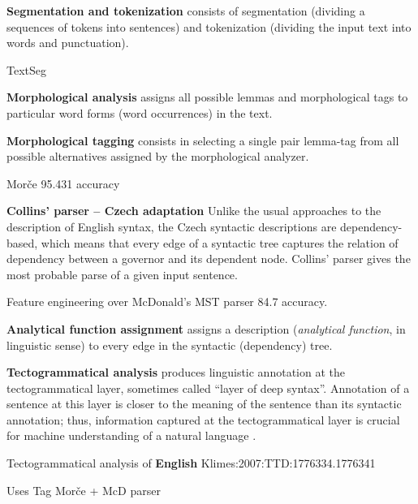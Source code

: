 \begin{description}
 
	\item \textbf{Segmentation and tokenization} consists of segmentation (dividing a sequences of tokens into sentences) and tokenization (dividing the input text into words and punctuation).
	
	TextSeg \citep{TextSeg}
		
	\item \textbf{Morphological analysis} \citep{biblio:HajicMorfTag} assigns all possible lemmas and morphological tags to particular word forms (word 
occurrences) in the text.
	
	\item \textbf{Morphological tagging} \citep{biblio:HajicMorfTag} consists in selecting a single pair lemma-tag from all possible alternatives assigned 
by the morphological analyzer.

Morče \citep{biblio:VoMorphologicalTagging2006} 95.431 accuracy
	
	\item \textbf{Collins' parser -- Czech adaptation} \citep{biblio:collinshbrt_1999} Unlike the usual approaches to the description of 
English syntax, the Czech syntactic descriptions are dependency-based, which means that every edge of a syntactic tree captures the relation of dependency between a governor and its dependent node. Collins' parser gives the most probable parse of a given input sentence.

Feature engineering over McDonald's MST parser \citep{Novak:2007:FEM:1776334.1776350} 84.7 accuracy.
	
	\item \textbf{Analytical function assignment} \citep{biblio:AlyticAsign} assigns a description (\emph{analytical function}, in linguistic sense) to every edge in the syntactic (dependency) tree.
	
	\item \textbf{Tectogrammatical analysis} produces linguistic annotation at the tectogrammatical layer, sometimes called ``layer of deep syntax''. 
	Annotation of a sentence at this layer is closer to the meaning of the sentence than its syntactic annotation; thus, information captured at the tectogrammatical layer is crucial for machine understanding of a natural language \citep{biblio:KlTransformationBasedTectogrammatical2006}.
	
	
Tectogrammatical analysis of \textbf{English} 	Klimes:2007:TTD:1776334.1776341

Uses Tag Morče + McD parser
\end{description}

